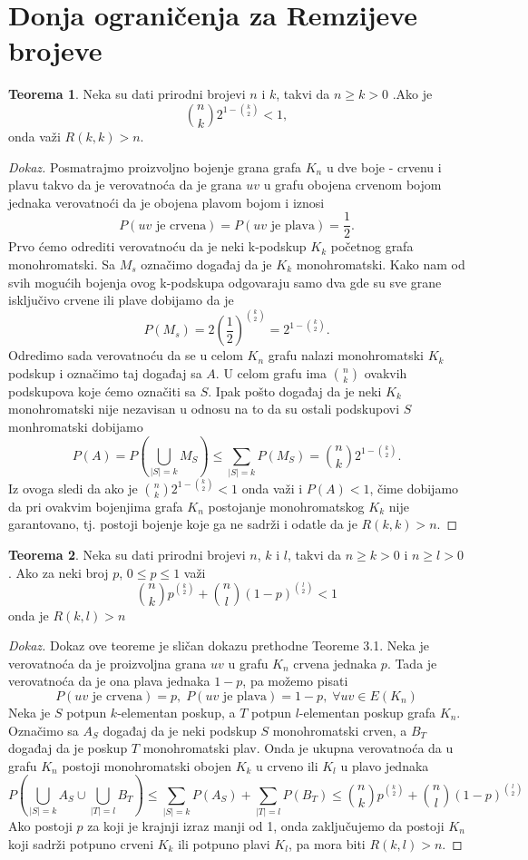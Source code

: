 \documentclass{article}
\theoremstyle{definition}
\newtheorem{teorema}{Teorema}[section]
\newcommand{\dokaz}[1]{\begin{proof}[Dokaz]#1\end{proof}}
\begin{document}
	\section{Donja ograničenja za Remzijeve brojeve}
	\begin{teorema}\label{dot1}
		Neka su dati prirodni brojevi $n$ i $k$, takvi da $n \geq{k} > 0$ .Ako je $$\binom{n}{k}2^{1 - \binom{k}{2}} < 1 ,$$  onda važi $R(k, k) > n$.
		\dokaz{
			Posmatrajmo proizvoljno bojenje grana grafa $K_n$ u dve boje - crvenu i plavu takvo da je verovatnoća da je grana $uv$ u grafu obojena crvenom bojom jednaka verovatnoći da je 		           obojena plavom bojom i iznosi 
			$$P(uv \text{ je crvena}) = P(uv \text{ je plava}) = \frac{1}{2}.$$
			\newline
			Prvo ćemo odrediti verovatnoću da je neki k-podskup $K_k$ početnog grafa monohromatski. 
			Sa $M_s$ označimo događaj da je $K_k$ monohromatski. Kako nam od svih mogućih bojenja ovog k-podskupa odgovaraju samo dva gde su sve grane isključivo crvene ili plave dobijamo
			da je
			$$P(M_s) = 2\left(\frac{1}{2}\right)^{\binom{k}{2}} = 2 ^ {1 - \binom{k}{2}}.$$
			Odredimo sada verovatnoću da se u celom $K_n$ grafu nalazi monohromatski $K_k$ podskup i označimo taj događaj sa $A$. U celom grafu ima $\binom{n}{k}$ ovakvih podskupova koje 			ćemo označiti sa $S$. Ipak pošto događaj da je neki $K_k$ monohromatski nije nezavisan u odnosu na to da su ostali podskupovi $S$ monhromatski dobijamo 
			$$P(A) = P(\bigcup_{|S|=k}M_S) \leq{\sum_{|S|=k}P(M_S)} = \binom{n}{k} 2 ^ {1 - \binom{k}{2}}.$$
			Iz ovoga sledi da ako je $\binom{n}{k} 2 ^ {1 - \binom{k}{2}} < 1$ onda važi i $P(A) < 1$, čime dobijamo da pri ovakvim bojenjima grafa $K_n$ postojanje monohromatskog 
			$K_k$ nije garantovano, tj. postoji bojenje koje ga ne sadrži i odatle da je $R(k,k) > n$.
		}
	\end{teorema}
	\begin{teorema}\label{dot2}
		Neka su dati prirodni brojevi $n$, $k$ i $l$, takvi da $n \geq{k} > 0$ i $n \geq{l} > 0$. Ako za neki broj $p$, $0 \leq{p} \leq 1$ važi
		$$\binom{n}{k}p^{\binom{k}{2}} + \binom{n}{l}(1 - p)^{\binom{l}{2}} < 1$$ onda je $R(k,l) > n$
		\dokaz{
			Dokaz ove teoreme je sličan dokazu prethodne Teoreme 3.1. Neka je verovatnoća da je proizvoljna grana $uv$ u grafu $K_n$ crvena jednaka $p$. Tada je verovatnoća da je ona               	plava jednaka $1 - p$, pa možemo pisati 
			$$P(uv \text{ je crvena}) = p,\; P(uv \text{ je plava}) = 1 - p, \; \forall uv \in E(K_n)$$
			Neka je $S$ potpun $k$-elementan poskup, a $T$ potpun $l$-elementan poskup grafa $K_n$. Označimo sa $A_S$ događaj da je neki podskup $S$ monohromatski crven, a $B_T$ događaj  	da je poskup $T$ monohromatski plav. Onda je ukupna verovatnoća da u grafu $K_n$ postoji monohromatski obojen $K_k$ u crveno ili $K_l$ u plavo jednaka
			$$P\left(\bigcup_{|S|=k}A_S \cup \bigcup_{|T|=l}B_T \right) \leq \sum_{|S|=k}P(A_S) + \sum_{|T|=l}P(B_T) \leq \binom{n}{k}p^{\binom{k}{2}} + \binom{n}{l}(1 - p)^{\binom{l}{2}}$$
			Ako postoji $p$ za koji je krajnji izraz manji od 1, onda zaključujemo da postoji $K_n$  koji sadrži potpuno crveni $K_k$ ili potpuno plavi $K_l$, pa mora biti $R(k,l)>n$.
		}
	\end{teorema}
\end{document}

